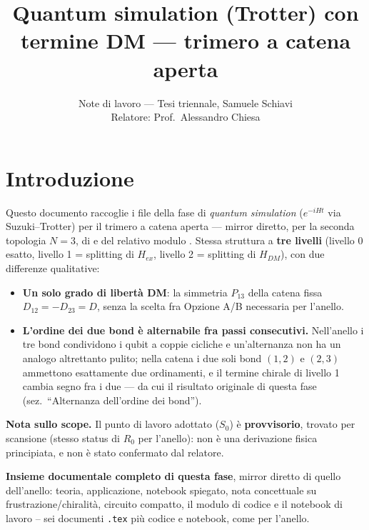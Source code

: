 \documentclass[11pt,a4paper]{article}
\title{Quantum simulation (Trotter) con termine DM — trimero a catena aperta}
\author{Note di lavoro — Tesi triennale, Samuele Schiavi\\ Relatore: Prof.\ Alessandro Chiesa}
\date{}
\begin{document}
\maketitle

\section*{Introduzione}

Questo documento raccoglie i file della fase di \emph{quantum simulation}
($e^{-iHt}$ via Suzuki--Trotter) per il trimero a catena aperta — mirror diretto,
per la seconda topologia $N=3$, di
\texttt{} e del
relativo modulo \texttt{}. Stessa struttura a
\textbf{tre livelli} (livello 0 esatto, livello 1 = splitting di $H_{ex}$, livello 2
= splitting di $H_{DM}$), con due differenze qualitative:

\begin{itemize}
\item \textbf{Un solo grado di libertà DM}: la simmetria $P_{13}$ della catena fissa
$D_{12}=-D_{23}=D$, senza la scelta fra Opzione A/B necessaria per l'anello.
\item \textbf{L'ordine dei due bond è alternabile fra passi consecutivi.} Nell'anello
i tre bond condividono i qubit a coppie cicliche e un'alternanza non ha un analogo
altrettanto pulito; nella catena i due soli bond $(1,2)$ e $(2,3)$ ammettono
esattamente due ordinamenti, e il termine chirale di livello 1 cambia segno fra i
due — da cui il risultato originale di questa fase (sez.\ ``Alternanza dell'ordine dei bond'').
\end{itemize}

\textbf{Nota sullo scope.} Il punto di lavoro adottato ($S_0$) è \textbf{provvisorio},
trovato per scansione (stesso status di $R_0$ per l'anello): non è una derivazione
fisica principiata, e non è stato confermato dal relatore.

\textbf{Insieme documentale completo di questa fase}, mirror diretto di
quello dell'anello: teoria, applicazione, notebook spiegato, nota
concettuale su frustrazione/chiralità, circuito compatto, il modulo di
codice e il notebook di lavoro -- sei documenti \texttt{.tex} più codice e
notebook, come per l'anello.

\section*{\texttt{}}
\end{document}
